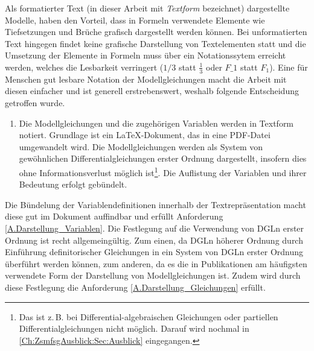 Als formatierter Text (in dieser Arbeit mit \textit{Textform} bezeichnet) dargestellte Modelle, haben den Vorteil, dass in Formeln verwendete Elemente wie Tiefsetzungen und Brüche grafisch dargestellt werden können. Bei unformatierten Text hingegen findet keine grafische Darstellung von Textelementen statt und die Umsetzung der Elemente in Formeln muss über ein Notationssytem erreicht werden, welches die Lesbarkeit verringert ($1/3$ statt $\frac{1}{3}$ oder $F\_1$ statt $F_1$). Eine für Menschen gut lesbare Notation der Modellgleichungen macht die Arbeit mit diesen einfacher und ist generell erstrebenswert, weshalb folgende Entscheidung getroffen wurde. 
\begin{enumerate}[resume*]
	\item \label{E.Textdok}Die Modellgleichungen und die zugehörigen Variablen werden in Textform notiert. Grundlage ist ein \LaTeX-Dokument, das in eine PDF-Datei umgewandelt wird. Die Modellgleichungen werden als System von gewöhnlichen Differentialgleichungen erster Ordnung dargestellt, insofern dies ohne Informationsverlust möglich ist\footnote{Das ist z.\,B. bei Differential-algebraischen Gleichungen oder partiellen Differentialgleichungen nicht möglich. Darauf wird nochmal in \autoref{Ch:ZsmfsgAusblick:Sec:Ausblick} eingegangen.}. Die Auflistung der Variablen und ihrer Bedeutung erfolgt gebündelt.
\end{enumerate}
Die Bündelung der Variablendefinitionen innerhalb der Textrepräsentation macht diese gut im Dokument auffindbar und erfüllt Anforderung \ref{A.Darstellung_Variablen}. Die Festlegung auf die Verwendung von DGLn erster Ordnung ist recht allgemeingültig. Zum einen, da DGLn höherer Ordnung durch Einführung definitorischer Gleichungen in ein System von DGLn erster Ordnung überführt werden können, zum anderen, da es die in Publikationen am häufigsten verwendete Form der Darstellung von Modellgleichungen ist. Zudem wird durch diese Festlegung die Anforderung \ref{A.Darstellung_Gleichungen} erfüllt.


